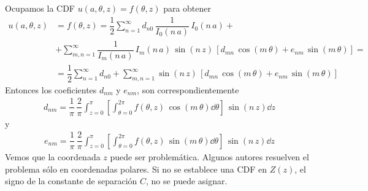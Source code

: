 Ocupamos la CDF $u(a, \theta, z) = f(\theta, z)$ para obtener
\begin{align*}
u(a, \theta, z) &= f(\theta, z) = \dfrac{1}{2} \sum_{n=1}^{\infty} d_{n0} \, \dfrac{1}{I_{0} (n \, a)} \, I_{0} (n \, a) + \\[0.5em]
&+ \sum_{m,n=1}^{\infty} \dfrac{1}{I_{m} (n \, a)} \, I_{m} (n \, a) \, \sin (n \, z) \, \left[ d_{mn} \, \cos (m \, \theta) + e_{nm} \, \sin (m \, \theta) \right] = \\[0.5em]
&= \dfrac{1}{2} \sum_{n=1}^{\infty} d_{n0} + \sum_{m,n=1}^{\infty} \sin (n \, z) \, \left[ d_{mn} \, \cos (m \, \theta) + e_{nm} \, \sin (m \, \theta) \right]
\end{align*}
Entonces los coeficientes $d_{nm}$ y $e_{nm}$, son correspondientemente
\begin{align*}
d_{nm} = \dfrac{1}{\pi} \, \dfrac{2}{\pi} \int_{z=0}^{\pi} \left[ \int_{\theta=0}^{2 \pi} f(\theta, z) \, \cos (m \, \theta) \dd{\theta} \right] \, \sin (n \, z) \dd{z}
\end{align*}
y
\begin{align*}
e_{nm} = \dfrac{1}{\pi} \, \dfrac{2}{\pi} \int_{z=0}^{\pi} \left[ \int_{\theta=0}^{2 \pi} f(\theta, z) \, \sin (m \, \theta) \dd{\theta} \right] \, \sin (n \, z) \dd{z}
\end{align*}
Vemos que la coordenada $z$ puede ser problemática. Algunos autores resuelven el problema sólo en coordenadas polares. Si no se establece una CDF en $Z (z)$, el signo de la constante de separación $C$, no se puede asignar.
